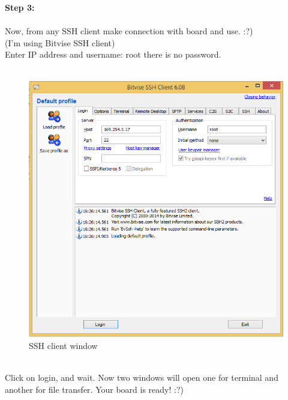 \documentclass[11pt,a4paper]{article}
\begin{document}
\newpage
	\textbf{Step 3:}\\
	\vspace{.3cm}\\
	Now, from any SSH client make connection with board and use. :?)\\
(I’m using Bitvise SSH client)\\
Enter IP address and username: root there is no password.\\
\vspace{.3cm}\\
\begin{figure}
	\includegraphics[width=\linewidth]{4.png}
    \caption{SSH client window}
    \end{figure}
\vspace{.3cm}\\
Click on login, and wait. Now two windows will open one for terminal and another for file transfer.
Your board is ready! :?)
  \vspace{.3cm}\\
\end{document}
